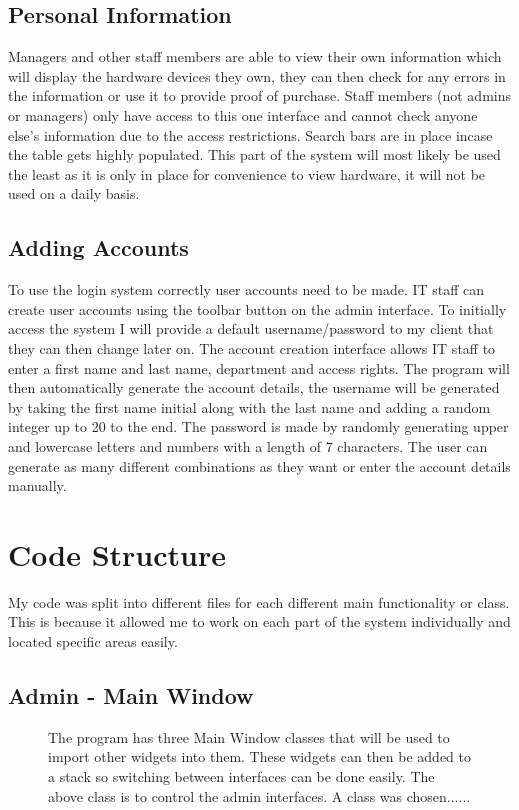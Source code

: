 \subsection{Personal Information}

Managers and other staff members are able to view their own information which will display the hardware devices they own, they can then check for any errors in the information or use it to provide proof of purchase. Staff members (not admins or managers) only have access to this one interface and cannot check anyone else's information due to the access restrictions. Search bars are in place incase the table gets highly populated. This part of the system will most likely be used the least as it is only in place for convenience to view hardware, it will not be used on a daily basis.

\subsection{Adding Accounts}

To use the login system correctly user accounts need to be made. IT staff can create user accounts using the toolbar button on the admin interface. To initially access the system I will provide a default username/password to my client that they can then change later on. The account creation interface allows IT staff to enter a first name and last name, department and access rights. The program will then automatically generate the account details, the username will be generated by taking the first name initial along with the last name and adding a random integer up to 20 to the end. The password is made by randomly generating upper and lowercase letters and numbers with a length of 7 characters. The user can generate as many different combinations as they want or enter the account details manually.

\section{Code Structure}

My code was split into different files for each different main functionality or class. This is because it allowed me to work on each part of the system individually and located specific areas easily.

\subsection{Admin - Main Window}
\begin{figure}[H]
    \caption{The program has three Main Window classes that will be used to import other widgets into them. These widgets can then be added to a stack so switching between interfaces can be done easily. The above class is to control the admin interfaces. A class was chosen......} \label{fig:MainWindowAdmin}
\end{figure}

